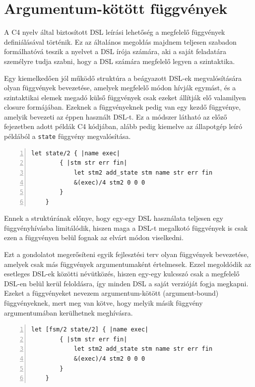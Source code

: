 \section{Argumentum-kötött függvények}\label{sec:ftr:argfun}

A C4 nyelv által biztosított \gls{DSL} leírási lehetőség a megfelelő függvények definiálásával történik.
Ez az általános megoldás majdnem teljesen szabadon formálhatóvá teszik a nyelvet a \gls{DSL} írója számára, aki a saját feladatára személyre tudja szabni, hogy a \gls{DSL} számára megfelelő legyen a szintaktika.

Egy kiemelkedően jól működő struktúra a beágyazott \gls{DSL}-ek megvalósítására olyan függvények bevezetése, amelyek megfelelő módon hívják egymást, és a szintaktikai elemek megadó külső függvények csak ezeket állítják elő valamilyen closure formájában.
Ezeknek a függvényeknek pedig van egy kezdő függvénye, amelyik bevezeti az éppen használt \gls{DSL}-t.
Ez a módszer látható az előző fejezetben adott példák C4 kódjában, alább pedig kiemelve az állapotgép leíró példából a {\tt state} függvény megvalósítása.

\begin{lstlisting}[gobble=2,numbers=left,label=lst:fsm-state-fn,caption={Az állapotgép \gls{DSL} {\tt state} függvénye}]
	let state/2 { |name exec|
		{ |stm str err fin|
			let stm2 add_state stm name str err fin
			&(exec)/4 stm2 0 0 0
		}
	}
\end{lstlisting}

Ennek a struktúrának előnye, hogy egy-egy \gls{DSL} használata teljesen egy függvényhívásba limitálódik, hiszen maga a \gls{DSL}-t megalkotó függvények is csak ezen a függvényen belül fognak az elvárt módon viselkedni.

Ezt a gondolatot megerősíteni egyik fejlesztési terv olyan függvények bevezetése, amelyek csak más függvények argumentumaként értelmesek.
Ezzel megoldódik az esetleges \gls{DSL}-ek közötti névütközés, hiszen egy-egy kulcsszó csak a megfelelő \gls{DSL}-en belül kerül feloldásra, így minden \gls{DSL} a saját verzióját fogja megkapni.
Ezeket a függvényeket nevezem argumentum-kötött (argument-bound) függvényeknek, mert meg van kötve, hogy melyik másik függvény argumentumában kerülhetnek meghívásra.

\begin{lstlisting}[gobble=4,numbers=left,label=lst:fsm-state-boundfn,caption={Az állapotgép \gls{DSL} lehetséges argumentum-kötöt {\tt state} függvénye}]
    let [fsm/2 state/2] { |name exec|
        { |stm str err fin|
            let stm2 add_state stm name str err fin
            &(exec)/4 stm2 0 0 0
        }
    }
\end{lstlisting}

